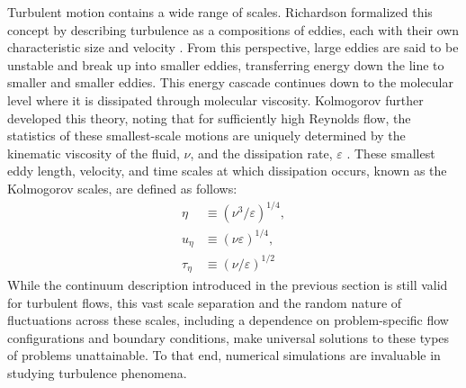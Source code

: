 Turbulent motion contains a wide range of scales. Richardson formalized this concept by describing turbulence as a compositions of eddies, each with their own characteristic size and velocity \cite{}. From this perspective, large eddies are said to be unstable and break up into smaller eddies, transferring energy down the line to smaller and smaller eddies. This energy cascade continues down to the molecular level where it is dissipated through molecular viscosity. Kolmogorov further developed this theory, noting that for sufficiently high Reynolds flow, the statistics of these smallest-scale motions are uniquely determined by the kinematic viscosity of the fluid, $\nu$, and the dissipation rate, $\varepsilon$ \cite{}. These smallest eddy length, velocity, and time scales at which dissipation occurs, known as the Kolmogorov scales, are defined as follows:
\begin{equation}\label{Kolmogorov}
\begin{aligned}
\eta &\equiv \left(  \nu^3/\varepsilon \right)^{1/4}, \\
u_{\eta} &\equiv \left(  \nu \varepsilon \right)^{1/4}, \\
\tau_{\eta} &\equiv \left(  \nu/ \varepsilon \right)^{1/2} 
\end{aligned}
\end{equation}
While the continuum description introduced in the previous section is still valid for turbulent flows, this vast scale separation and the random nature of fluctuations across these scales, including a dependence on problem-specific flow configurations and boundary conditions, make universal solutions to these types of problems unattainable. To that end, numerical simulations are invaluable in studying turbulence phenomena. 

%
%
%



